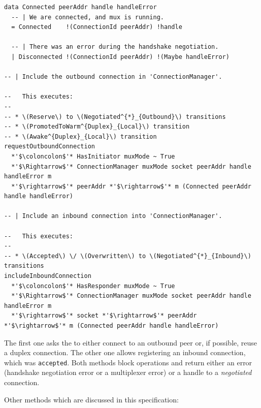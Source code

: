 \begin{lstlisting}
data Connected peerAddr handle handleError
  -- | We are connected, and mux is running.
  = Connected    !(ConnectionId peerAddr) !handle

  -- | There was an error during the handshake negotiation.
  | Disconnected !(ConnectionId peerAddr) !(Maybe handleError)

-- | Include the outbound connection in 'ConnectionManager'.

--   This executes:
--
-- * \(Reserve\) to \(Negotiated^{*}_{Outbound}\) transitions
-- * \(PromotedToWarm^{Duplex}_{Local}\) transition
-- * \(Awake^{Duplex}_{Local}\) transition
requestOutboundConnection
  *'$\coloncolon$'* HasInitiator muxMode ~ True
  *'$\Rightarrow$'* ConnectionManager muxMode socket peerAddr handle handleError m
  *'$\rightarrow$'* peerAddr *'$\rightarrow$'* m (Connected peerAddr handle handleError)

-- | Include an inbound connection into 'ConnectionManager'.

--   This executes:
--
-- * \(Accepted\) \/ \(Overwritten\) to \(Negotiated^{*}_{Inbound}\) transitions
includeInboundConnection
  *'$\coloncolon$'* HasResponder muxMode ~ True
  *'$\Rightarrow$'* ConnectionManager muxMode socket peerAddr handle handleError m
  *'$\rightarrow$'* socket *'$\rightarrow$'* peerAddr *'$\rightarrow$'* m (Connected peerAddr handle handleError)
\end{lstlisting}

The first one asks the \connmngr{} to either connect to an outbound peer or, if
possible, reuse a duplex connection. The other one allows registering an
inbound connection, which was \texttt{accepted}. Both methods block
operations and return either an error (handshake negotiation error or
a multiplexer error) or a handle to a \textit{negotiated} connection.

Other methods which are discussed in this specification:

